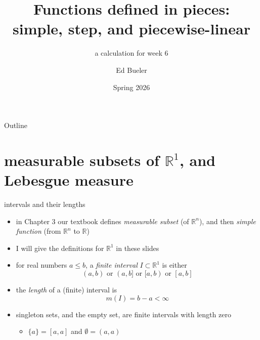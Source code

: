 \documentclass[10pt,
               svgnames,
               hyperref={colorlinks,
                         citecolor=DeepPink4,
                         linkcolor=FireBrick,
                         urlcolor=blue},
               usepdftitle=false]{beamer}
\title{Functions defined in pieces: \\ simple, step, and piecewise-linear}
\subtitle{a calculation for week 6}
\author{Ed Bueler}
\institute[]{UAF Math 617 Functional Analysis}
\date{Spring 2026}
\newcommand{\RR}{\mathbb{R}}
\begin{document}
\beamertemplatenavigationsymbolsempty

\begin{frame}
  \maketitle
\end{frame}


\begin{frame}{Outline}
  \tableofcontents[hideallsubsections]
\end{frame}

\AtBeginSection[]
{%
}


\section{measurable subsets of $\RR^1$, and Lebesgue measure}

\begin{frame}{intervals and their lengths}

\begin{itemize}
\item in Chapter 3 our textbook defines \emph{measurable subset} (of $\RR^n$), and then \emph{simple function} (from $\RR^n$ to $\RR$)
\item I will give the definitions for $\RR^1$ in these slides
\end{itemize}

\begin{definition}
\begin{itemize}
\item for real numbers $a\le b$, a \emph{finite interval} $I\subset \RR^1$ is either
    $$(a,b) \text{ or } (a,b] \text{ or } [a,b) \text{ or } [a,b]$$ 
\item the \emph{length} of a (finite) interval is
    $$m(I) = b - a < \infty$$
\end{itemize}
\end{definition}

\begin{itemize}
\item singleton sets, and the empty set, are finite intervals with length zero
   \begin{itemize}
   \item[$\circ$] $\{a\} = [a,a]$ and $\emptyset = (a,a)$
   \end{itemize}
\end{itemize}
\end{frame}
\end{document}
